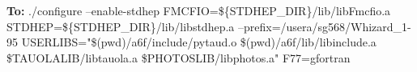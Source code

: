 \documentclass[11pt, oneside]{article}   	%
\begin{document}
\textbf{To:}
\newline
 ./configure --enable-stdhep FMCFIO=\$\{STDHEP\_DIR\}/lib/libFmcfio.a \newline
 STDHEP=\$\{STDHEP\_DIR\}/lib/libstdhep.a \newline
 --prefix=/usera/sg568/Whizard\_1-95 \newline
 USERLIBS="\$(pwd)/a6f/include/pytaud.o \$(pwd)/a6f/lib/libinclude.a \newline
 \$TAUOLALIB/libtauola.a \$PHOTOSLIB/libphotos.a" \newline
 F77=gfortran

\end{document}
